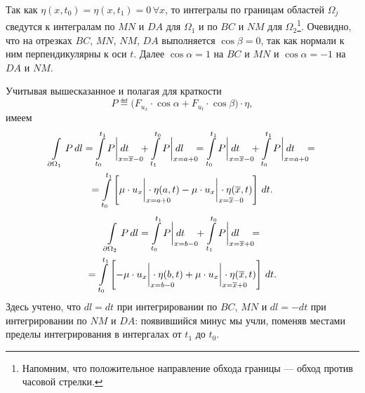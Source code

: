 Так как $\eta(x,t_0)=\eta(x,t_1)=0\,\forall x$, то интегралы по границам областей $\Omega_j$ сведутся к интегралам по $M\!N$ и $D\!A$ для $\Omega_1$ и по $BC$ и $N\!M$ для $\Omega_2$\footnote{Напомним, что положительное направление обхода границы --- обход против часовой стрелки.}. Очевидно, что на отрезках $BC$, $M\!N$, $N\!M$, $D\!A$ выполняется $\cos\beta=0$, так как нормали к ним перпендикулярны к оси $t$. Далее $\cos\alpha=1$ на $BC$ и $M\!N$ и $\cos\alpha=-1$ на $D\!A$ и $N\!M$.

Учитывая вышесказанное и полагая для краткости
\begin{equation*}
	P\eqdef\big(F_{u_x}\cdot\cos\alpha+F_{u_t}\cdot\cos\beta\big)\cdot\eta,
\end{equation*}
имеем
\begin{multline}\label{l11:eq:2}
	\int\limits_{\partial\Omega_1}P\,dl=\int\limits_{t_0}^{t_1}P\bigg|_{\lefteqn{\scriptstyle x=\overline{x}-0}}\,dt\quad+\int\limits_{t_1}^{t_0}P\bigg|_{\lefteqn{\scriptstyle x=a+0}}\,dl\quad=\int\limits_{t_0}^{t_1}P\bigg|_{\lefteqn{\scriptstyle x=\overline{x}-0}}\,dt\quad+\int\limits_{t_0}^{t_1}P\bigg|_{\lefteqn{\scriptstyle x=a+0}}\,dt\quad=\\
	=\int\limits_{t_0}^{t_1}\left[\mu\cdot u_x\bigg|_{\lefteqn{\scriptstyle x=a+0}}\cdot\eta(a,t)-\mu\cdot u_x\bigg|_{\lefteqn{\scriptstyle x=\overline{x}-0}}\cdot\eta(\overline{x},t)\right]\,dt.
\end{multline}  
\begin{multline}
	\label{l11:eq:3}
	\int\limits_{\partial\Omega_2}P\,dl=\int\limits_{t_0}^{t_1}P\bigg|_{\lefteqn{\scriptstyle x=b-0}}\,dt\quad+\int\limits_{t_1}^{t_0}P\bigg|_{\lefteqn{\scriptstyle x=\overline{x}+0}}\,dl\quad=\\=\int\limits_{t_0}^{t_1}\left[-\mu\cdot u_x\bigg|_{\lefteqn{\scriptstyle x=b-0}}\cdot\eta(b,t)+\mu\cdot u_x\bigg|_{\lefteqn{\scriptstyle x=\overline{x}+0}}\cdot\eta(\overline{x},t)\right]\,dt.
\end{multline}
Здесь учтено, что $dl=dt$ при интегрировании по $BC$, $M\!N$ и $dl=-dt$ при интегрировании по $N\!M$ и $D\!A$: появившийся минус мы учли, поменяв местами пределы интегрирования в интергалах от $t_1$ до $t_0$.


